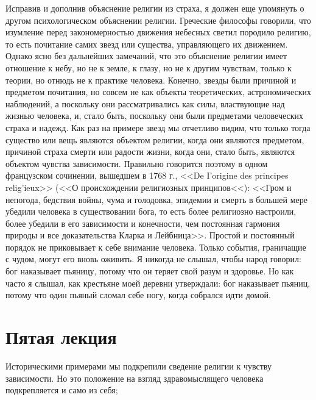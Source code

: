 \documentclass[12pt]{article}
\begin{document}
Исправив и дополнив объяснение религии из страха, я должен еще упомянуть о другом психологическом объяснении религии. Греческие философы говорили, что изумление перед закономерностью движения небесных светил породило религию, то есть почитание самих звезд или существа, управляющего их движением. Однако ясно без дальнейших замечаний, что это объяснение религии имеет отношение к небу, но не к земле, к глазу, но не к другим чувствам, только к теории, но отнюдь не к практике человека. Конечно, звезды были причиной и предметом почитания, но совсем не как объекты теоретических, астрономических наблюдений, а поскольку они рассматривались как силы, властвующие над жизнью человека, и, стало быть, поскольку они были предметами человеческих страха и надежд. Как раз на примере звезд мы отчетливо видим, что только тогда существо или вещь являются объектом религии, когда они являются предметом, причиной страха смерти или радости жизни, когда они, стало быть, являются объектом чувства зависимости. Правильно говорится поэтому в одном французском сочинении, вышедшем в 1768 г., <<De I'origine des principes relig'ieux>> (<<О происхождении религиозных принципов<<): <<Гром и непогода, бедствия войны, чума и голодовка, эпидемии и смерть в большей мере убедили человека в существовании бога, то есть более религиозно настроили, более убедили в его зависимости и конечности, чем постоянная гармония природы и все доказательства Кларка и Лейбница>>. Простой и постоянный порядок не приковывает к себе внимание человека. Только события, граничащие с чудом, могут его вновь оживить. Я никогда не слышал, чтобы народ говорил: бог наказывает пьяницу, потому что он теряет свой разум и здоровье. Но как часто я слышал, как крестьяне моей деревни утверждали: бог наказывает пьяниц, потому что один пьяный сломал себе ногу, когда собрался идти домой. 

\section*{Пятая лекция}

Историческими примерами мы подкрепили сведение религии к чувству зависимости. Но это положение на взгляд здравомыслящего человека подкрепляется и само из себя; 
\end{document}
